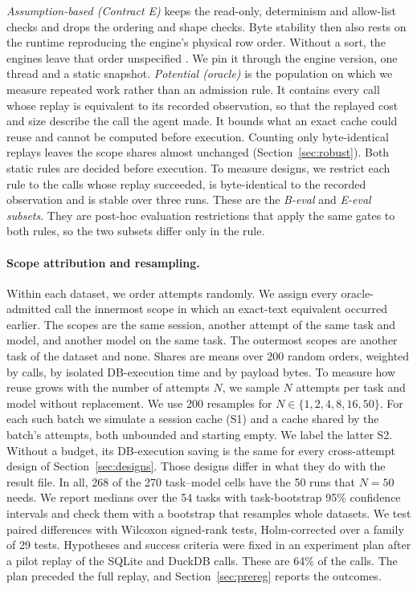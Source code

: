 \emph{Assumption-based (Contract E)} keeps the read-only, determinism and allow-list checks and drops the ordering
and shape checks. Byte stability then also rests on the runtime reproducing the engine's physical row order. Without a sort, the engines leave that order unspecified \cite{postgres2026order,sqlite2026select,mongodb2026sort}. We pin it through the engine version, one thread and a static snapshot. \emph{Potential (oracle)} is the population on
which we measure repeated work rather than an admission rule. It contains every call whose replay is equivalent to
its recorded observation, so that the replayed cost and size describe the call the agent made. It bounds what an
exact cache could reuse and cannot be computed before execution. Counting only byte-identical replays leaves the scope shares almost unchanged (Section~\ref{sec:robust}). Both static rules
are decided before execution. To measure designs, we restrict each rule to the calls whose replay succeeded, is
byte-identical to the recorded observation and is stable over three runs. These are the \emph{B-eval} and
\emph{E-eval subsets}. They are post-hoc evaluation restrictions that apply the same gates to both rules, so the two
subsets differ only in the rule.




\paragraph{Scope attribution and resampling.}
Within each dataset, we order attempts randomly. We assign every oracle-admitted call the innermost scope in which an
exact-text equivalent occurred earlier. The scopes are the same session, another attempt of the same task and model, and another model on the same task. The outermost scopes are another task of the dataset and none. Shares are means over 200 random orders,
weighted by calls, by isolated DB-execution time and by payload bytes. To measure how reuse grows with the number of
attempts $N$, we sample $N$ attempts per task and model without replacement. We use 200 resamples for $N \in
\{1,2,4,8,16,50\}$. For each such batch we simulate a session cache (S1) and a cache shared by the batch's attempts,
both unbounded and starting empty. We label the latter S2. Without a budget, its DB-execution saving is the same for every cross-attempt design of Section~\ref{sec:designs}. Those designs differ in what they do with the result file. In all,
268 of the 270 task--model cells have the 50 runs that $N=50$ needs. We report medians over the 54 tasks with
task-bootstrap 95\% confidence intervals and check them with a bootstrap that resamples whole datasets. We test
paired differences with Wilcoxon signed-rank tests, Holm-corrected over a family of 29 tests. Hypotheses and success criteria were fixed in an experiment plan after a pilot replay of the SQLite and DuckDB calls. These are 64\% of the calls. The plan preceded the full replay, and Section~\ref{sec:prereg} reports the outcomes.

